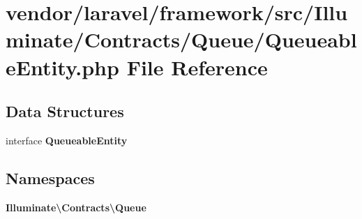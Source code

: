 \section{vendor/laravel/framework/src/\+Illuminate/\+Contracts/\+Queue/\+Queueable\+Entity.php File Reference}
\label{_queueable_entity_8php}
\subsection*{Data Structures}
\begin{DoxyCompactItemize}
\item 
interface {\bf Queueable\+Entity}
\end{DoxyCompactItemize}
\subsection*{Namespaces}
\begin{DoxyCompactItemize}
\item 
 {\bf Illuminate\textbackslash{}\+Contracts\textbackslash{}\+Queue}
\end{DoxyCompactItemize}
